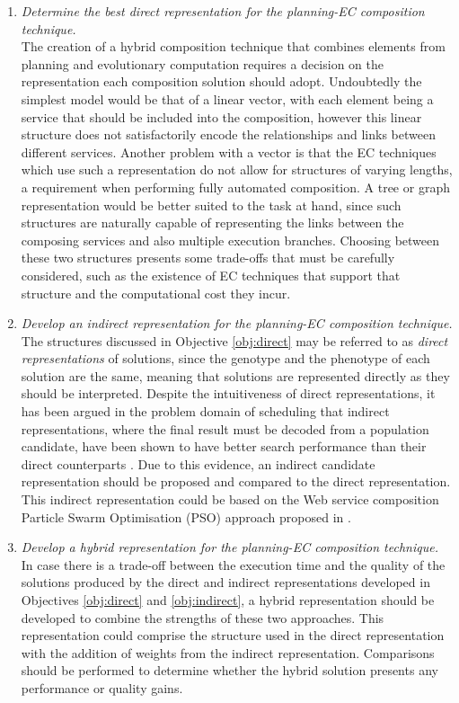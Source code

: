 \begin{enumerate}
 \item \label{obj:direct} \textit{Determine the best direct representation for the planning-EC composition technique.}\\
 The creation of a hybrid composition technique that combines elements from planning and evolutionary computation requires a decision on the representation each composition solution should adopt. Undoubtedly the simplest model would be that of a linear vector, with each element being a service that should be included into the composition, however this linear structure does not satisfactorily encode the relationships and links between different services. Another problem with a vector is that the EC techniques which use such a representation do not allow for structures of varying lengths, a requirement when performing fully automated composition. A tree or graph representation would be better suited to the task at hand, since such structures are naturally capable of representing the links between the composing services and also multiple execution branches. Choosing between these two structures presents some trade-offs that must be carefully considered, such as the existence of EC techniques that support that structure and the computational cost they incur.
 
 \item \label{obj:indirect} \textit{Develop an indirect representation for the planning-EC composition technique.}\\
 The structures discussed in Objective \ref{obj:direct} may be referred to as \textit{direct representations} of solutions, since the genotype and the phenotype of each solution are the same, meaning that solutions are represented directly as they should be interpreted. Despite the intuitiveness of direct representations, it has been argued in the problem domain of scheduling that indirect representations, where the final result must be decoded from a population candidate, have been shown to have better search performance than their direct counterparts \cite{hart2005evolutionary,craenen2001handle}. Due to this evidence, an indirect candidate representation should be proposed and compared to the direct representation. This indirect representation could be based on the Web service composition Particle Swarm Optimisation (PSO) approach proposed in \cite{da2014graph}.
 
 \item \label{obj:hybrid} \textit{Develop a hybrid representation for the planning-EC composition technique.}\\
 In case there is a trade-off between the execution time and the quality of the solutions produced by the direct and indirect representations developed in Objectives \ref{obj:direct} and \ref{obj:indirect}, a hybrid representation should be developed to combine the strengths of these two approaches. This representation could comprise the structure used in the direct representation with the addition of weights from the indirect representation. Comparisons should be performed to determine whether the hybrid solution presents any performance or quality gains.
 

\end{enumerate}
